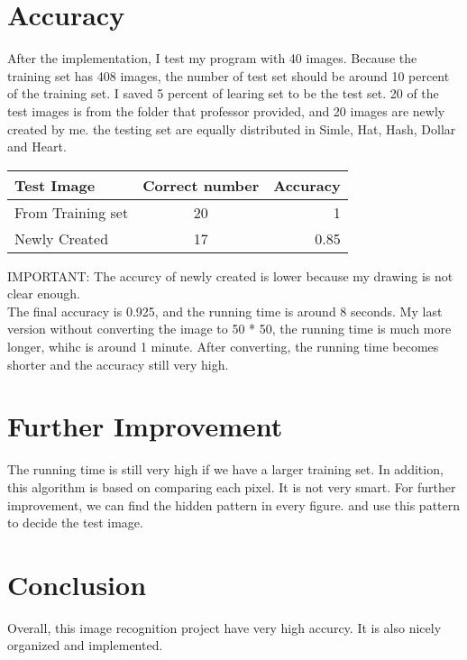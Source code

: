 \documentclass[a4paper]{article}
\begin{document}
\section{Accuracy}
	After the implementation, I test my program with 40 images. Because the training set has 408 images, the number of test set should be around 10 percent of the training set. I saved 5 percent of learing set to be the test set. 20 of the test images is from the folder that professor provided, and 20 images are newly created by me. the testing set are equally distributed in Simle, Hat, Hash, Dollar and Heart.  
\newline
\begin{center}
  \begin{tabular}{ l | c | r }
    \hline
    Test Image & Correct number  & Accuracy \\ \hline
    From Training set & 20 & 1 \\ \hline
    Newly Created & 17 & 0.85 \\
    \hline
  \end{tabular}
\end{center}
	IMPORTANT: The accurcy of newly created is lower because my drawing is not clear enough. \\
	The final accuracy is 0.925, and the running time is around 8 seconds. My last version without converting the image to 50 * 50, the running time is much more longer, whihc is around 1 minute. After converting, the running time becomes shorter and the accuracy still very high. 

\section{Further Improvement}
	The running time is still very high if we have a larger training set. In addition, this algorithm is based on comparing each pixel. It is not very smart. For further improvement, we can find the hidden pattern in every figure. and use this pattern to decide the test image.  
    
\section{Conclusion}
	Overall, this image recognition project have very high accurcy. It is also nicely organized and implemented.  
\end{document}
